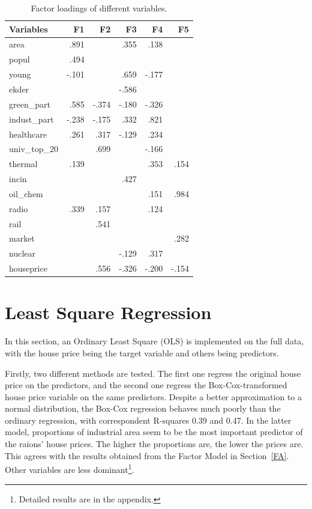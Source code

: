 \documentclass{article}
\begin{document}
\begin{table}[t]
\caption{Factor loadings of different variables.}
\label{tab1}
\vskip 0.15in
\begin{center}
\begin{small}
\begin{sc}
\begin{tabular}{lrrrrr}
\toprule
Variables & F1 & F2 & F3 & F4 & F5  \\
\midrule
area & .891 &  & .355 & .138 & \\
popul & .494 &  &  &  & \\
young & -.101 &  & .659 & -.177 & \\
ekder &  &  & -.586 &  & \\
green\_part & .585 & -.374 & -.180 & -.326 & \\
indust\_part & -.238 & -.175 & .332 & .821 & \\
healthcare & .261 & .317 & -.129 & .234 & \\
univ\_top\_20 &  & .699 &  & -.166 & \\
thermal & .139 &  &  & .353 & .154\\
incin &  &  & .427 &  & \\
oil\_chem &  &  &  & .151 & .984\\
radio & .339 & .157 &  & .124 & \\
rail &  & .541 &  &  & \\
market &  &  &  &  & .282\\
nuclear &  &  & -.129 & .317 & \\
houseprice &  & .556 & -.326 & -.200 & -.154\\
\bottomrule
\end{tabular}
\end{sc}
\end{small}
\end{center}
\vskip -0.1in
\end{table}

\section{Least Square Regression}
In this section, an Ordinary Least Square (OLS) is implemented on the full data, with the house price being the target variable and others being predictors.

Firstly, two different methods are tested. The first one regress the original house price on the predictors, and the second one regress the Box-Cox-transformed house price variable on the same predictors. Despite a better approximation to a normal distribution, the Box-Cox regression behaves much poorly than the ordinary regression, with correspondent R-squares 0.39 and 0.47. In the latter model, proportions of industrial area seem to be the most important predictor of the raions' house prices. The higher the proportions are, the lower the prices are. This agrees with the results obtained from the Factor Model in Section~\ref{FA}. Other variables are less dominant\footnote{Detailed results are in the appendix.}.
\end{document}
